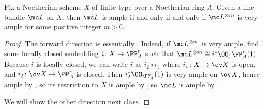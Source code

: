 \documentclass[../notes.tex]{subfiles}
\begin{document}
\begin{proposition}
	Fix a Noetherian scheme $X$ of finite type over a Noetherian ring $A$. Given a line bundle $\mc L$ on $X$, then $\mc L$ is ample if and only if and only if $\mc L^{\otimes m}$ is very ample for some positive integer $m>0$.
\end{proposition}
\begin{proof}
	The forward direction is essentially . Indeed, if $\mc L^{\otimes m}$ is very ample, find some locally closed embedding $i\colon X\to\PP^r_A$ such that $\mc L^{\otimes m}\cong i^*\OO_){\PP^r_A}(1)$. Because $i$ is locally closed, we can write $i$ as $i_2\circ i_1$ where $i_1\colon X\to\ov X$ is open, and $i_2\colon\ov X\to\PP^r_A$ is closed. Then $i_2^*\OO_{\PP^r_A}(1)$ is very ample on $\ov X$, hence ample by , so its restriction to $X$ is ample by , so $\mc L$ is ample by .

	We will show the other direction next class.
\end{proof}
\end{document}
